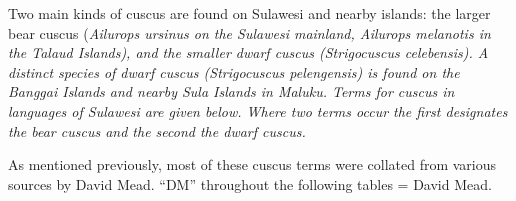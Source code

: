Two main kinds of cuscus are found on Sulawesi
and nearby islands: the larger bear cuscus (\it{Ailurops ursinus}
on the Sulawesi mainland,
\it{Ailurops melanotis} in the Talaud Islands),
and the smaller dwarf cuscus \it{(Strigocuscus celebensis)}.
A distinct species of dwarf cuscus \it{(Strigocuscus pelengensis)}
is found on the Banggai Islands
and nearby Sula Islands in Maluku.
Terms for cuscus in languages of Sulawesi are given below.
Where two terms occur the first designates the bear cuscus
and the second the dwarf cuscus.

As mentioned previously, most of these cuscus terms
were collated from various sources by David Mead.
``DM'' throughout the following tables = David Mead.